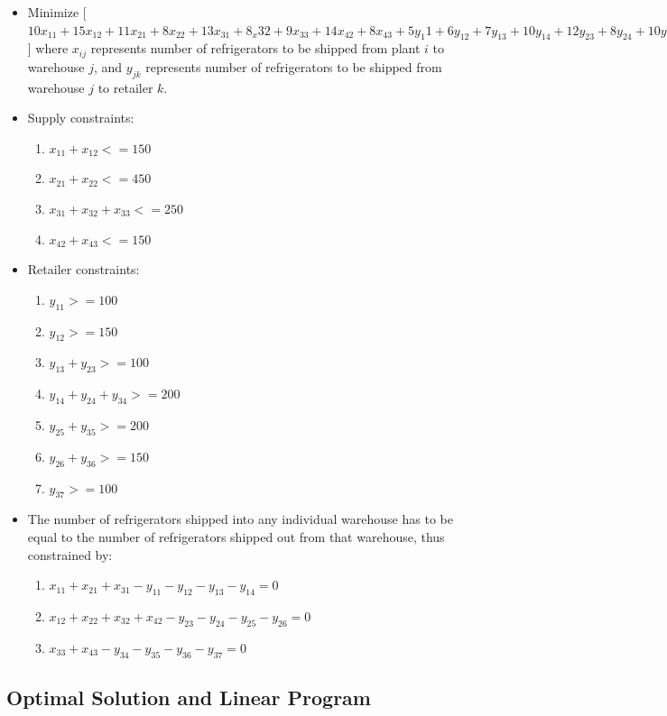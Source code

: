 \documentclass[11pt]{scrreprt}
\begin{document}
\begin{itemize}
	\item Minimize
[$10x_{11}+15x_{12}+11x_{21}+8x_{22}+13x_{31}+8_x{32}+9x_{33}+14x_{42}+8x_{43}+5y_{1}1+6y_{12}+7y_{13}+10y_{14}+12y_{23}+8y_{24}+10y_{25}+14y_{26}+12y_{35}+12y_{36}+6y_{37}$] 
where $x_{ij}$ represents number of refrigerators to be shipped from 
plant $i$ to warehouse $j$, and $y_{jk}$ represents number of 
refrigerators to be shipped  from warehouse $j$ to retailer $k$.
	\item Supply constraints:
	\begin{enumerate}
		\item $x_{11} + x_{12} <= 150$
		\item $x_{21} + x_{22} <= 450$
		\item $x_{31} + x_{32} + x_{33} <= 250$
		\item $x_{42} + x_{43} <= 150$
	\end{enumerate}
	\item Retailer constraints:
	\begin{enumerate}
		\item $y_{11} >= 100$
		\item $y_{12} >= 150$
		\item $y_{13} + y_{23} >= 100$
		\item $y_{14} + y_{24} + y_{34} >= 200$
		\item $y_{25} + y_{35} >= 200$
		\item $y_{26} + y_{36} >= 150$
		\item $y_{37} >= 100$
	\end{enumerate}
	\item The number of refrigerators shipped into any individual 
		warehouse has to be equal to the number of refrigerators 
		shipped out from that warehouse, thus constrained by:
	\begin{enumerate}
		\item $x_{11} + x_{21} + x_{31} - y_{11} - y_{12} - y_{13} - y_{14} = 0$
		\item $x_{12} + x_{22} + x_{32} + x_{42} - y_{23} - y_{24} - y_{25} - y_{26} = 0$
		\item $x_{33} + x_{43} - y_{34} - y_{35} - y_{36} - y_{37} = 0$
	\end{enumerate}
\end{itemize}

\subsection{Optimal Solution and Linear Program}
\end{document}
